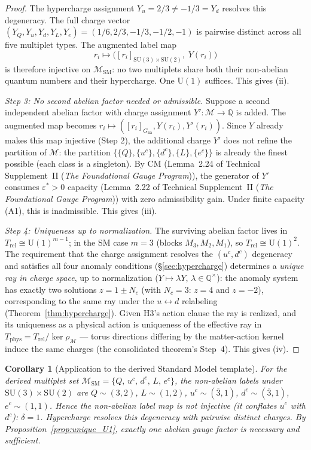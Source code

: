 \documentclass[11pt]{article}
\newtheorem{corollary}[theorem]{Corollary}
\theoremstyle{definition}
\newcommand{\SU}{\mathrm{SU}}
\newcommand{\U}{\mathrm{U}}
\newcommand{\TSII}{Technical Supplement~II (\emph{The Foundational Gauge Program})}
\begin{document}
\begin{proof}
The hypercharge assignment $Y_u = 2/3 \ne -1/3 = Y_d$
resolves this degeneracy.  The full charge vector
$(Y_Q, Y_u, Y_d, Y_L, Y_e) = (1/6, 2/3, -1/3, -1/2, -1)$
is pairwise distinct across all five multiplet types.  The augmented
label map
\[
  r_i \mapsto \bigl([r_i]_{\SU(3) \times \SU(2)},\; Y(r_i)\bigr)
\]
is therefore injective on $\mathcal{M}_{\mathrm{SM}}$: no two
multiplets share both their non-abelian quantum numbers and their
hypercharge.  One $\U(1)$ suffices.  This gives (ii).

\textit{Step 3: No second abelian factor needed or admissible.}\quad
Suppose a second independent abelian factor with charge assignment
$Y': \mathcal{M} \to \mathbb{Q}$ is added.  The augmented map
becomes $r_i \mapsto ([r_i]_{G_{\mathrm{na}}}, Y(r_i), Y'(r_i))$.
Since $Y$ already makes this map injective (Step 2), the additional
charge $Y'$ does not refine the partition of $\mathcal{M}$: the
partition $\{\{Q\}, \{u^c\}, \{d^c\}, \{L\}, \{e^c\}\}$ is already
the finest possible (each class is a singleton).  By CM
(Lemma~2.24 of \TSII{}), the generator of $Y'$ consumes
$\varepsilon^* > 0$ capacity (Lemma~2.22 of \TSII{}) with zero
admissibility gain.  Under finite capacity (A1), this is inadmissible.
This gives (iii).

\textit{Step 4: Uniqueness up to normalization.}\quad
The surviving abelian factor lives in
$T_{\mathrm{rel}} \cong \mathrm{U}(1)^{m-1}$; in the SM case
$m = 3$ (blocks $M_3, M_2, M_1$), so $T_{\mathrm{rel}} \cong
\mathrm{U}(1)^2$.  The requirement that the charge assignment
resolves the $(u^c, d^c)$ degeneracy and satisfies all four anomaly
conditions (\S\ref{sec:hypercharge}) determines a \emph{unique ray
in charge space}, up to normalization
($Y \mapsto \lambda Y$, $\lambda \in \mathbb{Q}^\times$): the
anomaly system has exactly two solutions $z = 1 \pm N_c$ (with
$N_c = 3$: $z = 4$ and $z = -2$), corresponding to the same ray under
the $u \leftrightarrow d$ relabeling
(Theorem~\ref{thm:hypercharge}).  Given H3's action clause the ray is
realized, and its uniqueness as a physical action is uniqueness of the
effective ray in $T_{\mathrm{phys}} = T_{\mathrm{rel}} /
\ker\rho_{\mathcal{M}}$ --- torus directions differing by the
matter-action kernel induce the same charges (the consolidated
theorem's Step~4).  This gives (iv).
\end{proof}

\begin{corollary}[Application to the derived Standard Model template]
\label{cor:unique_U1_SM}
For the derived multiplet set
$\mathcal{M}_{\mathrm{SM}} = \{Q,\, u^c,\, d^c,\, L,\, e^c\}$,
the non-abelian labels under $\SU(3) \times \SU(2)$ are
$Q \sim (3,2)$, $L \sim (1,2)$, $u^c \sim (\bar{3},1)$,
$d^c \sim (\bar{3},1)$, $e^c \sim (1,1)$.
Hence the non-abelian label map is not injective (it conflates $u^c$
with $d^c$): $\delta = 1$.  Hypercharge resolves this degeneracy with
pairwise distinct charges.  By Proposition~\ref{prop:unique_U1},
exactly one abelian gauge factor is necessary and sufficient.
\end{corollary}
\end{document}

